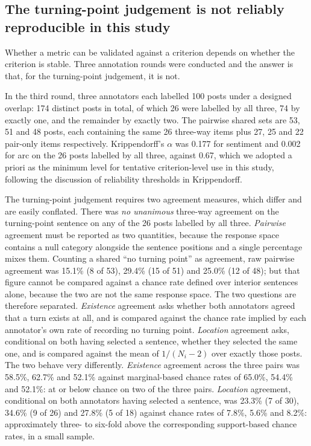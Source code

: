 \documentclass[fleqn,10pt]{wlscirep}
\begin{document}
\subsection{The turning-point judgement is not reliably reproducible in this study}\label{subsec:reliability}

Whether a metric can be validated against a criterion depends on whether the criterion is stable. Three annotation rounds were conducted and the answer is that, for the turning-point judgement, it is not.

In the third round, three annotators each labelled 100 posts under a designed overlap: 174 distinct posts in total, of which 26 were labelled by all three, 74 by exactly one, and the remainder by exactly two. The pairwise shared sets are 53, 51 and 48 posts, each containing the same 26 three-way items plus 27, 25 and 22 pair-only items respectively. Krippendorff's $\alpha$ was 0.177 for sentiment and 0.002 for arc on the 26 posts labelled by all three, against 0.67, which we adopted a priori as the minimum level for tentative criterion-level use in this study, following the discussion of reliability thresholds in Krippendorff\cite{krippendorff2004}.

The turning-point judgement requires two agreement measures, which differ and are easily conflated. There was \emph{no unanimous} three-way agreement on the turning-point sentence on any of the 26 posts labelled by all three. \emph{Pairwise} agreement must be reported as two quantities, because the response space contains a null category alongside the sentence positions and a single percentage mixes them. Counting a shared ``no turning point'' as agreement, raw pairwise agreement was 15.1\% (8 of 53), 29.4\% (15 of 51) and 25.0\% (12 of 48); but that figure cannot be compared against a chance rate defined over interior sentences alone, because the two are not the same response space. The two questions are therefore separated. \emph{Existence} agreement asks whether both annotators agreed that a turn exists at all, and is compared against the chance rate implied by each annotator's own rate of recording no turning point. \emph{Location} agreement asks, conditional on both having selected a sentence, whether they selected the same one, and is compared against the mean of $1/(N_i-2)$ over exactly those posts. The two behave very differently. \emph{Existence} agreement across the three pairs was 58.5\%, 62.7\% and 52.1\% against marginal-based chance rates of 65.0\%, 54.4\% and 52.1\%: at or below chance on two of the three pairs. \emph{Location} agreement, conditional on both annotators having selected a sentence, was 23.3\% (7 of 30), 34.6\% (9 of 26) and 27.8\% (5 of 18) against chance rates of 7.8\%, 5.6\% and 8.2\%: approximately three- to six-fold above the corresponding support-based chance rates, in a small sample.
\end{document}
